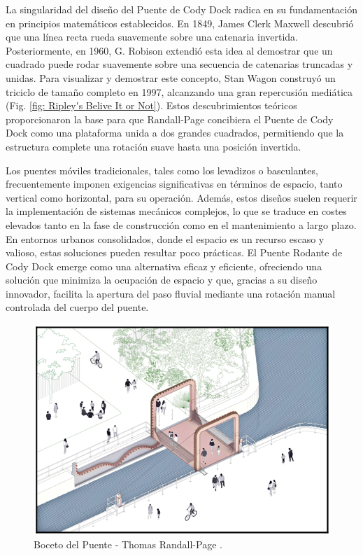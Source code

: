 \documentclass{IEEEtran}
\begin{document}
La singularidad del diseño del Puente de Cody Dock radica en su fundamentación en principios matemáticos establecidos. En 1849, James Clerk Maxwell descubrió que una línea recta rueda suavemente sobre una catenaria invertida. Posteriormente, en 1960, G. Robison extendió esta idea al demostrar que un cuadrado puede rodar suavemente sobre una secuencia de catenarias truncadas y unidas. Para visualizar y demostrar este concepto, Stan Wagon construyó un triciclo de tamaño completo en 1997, alcanzando una gran repercusión mediática (Fig. \ref{fig: Ripley's Belive It or Not}). Estos descubrimientos teóricos proporcionaron la base para que Randall-Page concibiera el Puente de Cody Dock como una plataforma unida a dos grandes cuadrados, permitiendo que la estructura complete una rotación suave hasta una posición invertida. 

Los puentes móviles tradicionales, tales como los levadizos o basculantes, frecuentemente imponen exigencias significativas en términos de espacio, tanto vertical como horizontal, para su operación. Además, estos diseños suelen requerir la implementación de sistemas mecánicos complejos, lo que se traduce en costes elevados tanto en la fase de construcción como en el mantenimiento a largo plazo. En entornos urbanos consolidados, donde el espacio es un recurso escaso y valioso, estas soluciones pueden resultar poco prácticas. El Puente Rodante de Cody Dock emerge como una alternativa eficaz y eficiente, ofreciendo una solución que minimiza la ocupación de espacio y que, gracias a su diseño innovador, facilita la apertura del paso fluvial mediante una rotación manual controlada del cuerpo del puente.

\begin{figure}[h]
    \centering
    \includegraphics[width = 0.5 \textwidth]{Imagenes/Cody Dock Sketch.png}
    \caption{Boceto del Puente - Thomas Randall-Page \cite{randallpage2021}.}
    \label{fig: Dibujo de Cody Dock}
\end{figure}
\end{document}

